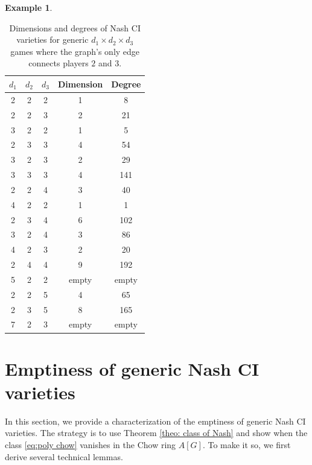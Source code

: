 \documentclass[11pt]{amsart}
\numberwithin{equation}{section}
\theoremstyle{plain}
\numberwithin{theorem}{section}
\theoremstyle{definition}
\newtheorem{example}[theorem]{Example}
\begin{document}
\begin{example}
\begin{table}%
\begin{tabular}{|c|c|c|c|c|}
\hline
$d_1$ & $d_2$ & $d_3$ & Dimension & Degree \\ \hline
2 & 2 & 2 & 1 & 8 \\ \hline
2 & 2 & 3 & 2 & 21 \\ \hline
3 & 2 & 2 & 1 & 5 \\ \hline
2 & 3 & 3 & 4 & 54 \\ \hline
3 & 2 & 3 & 2 & 29 \\ \hline
3 & 3 & 3 & 4 & 141 \\ \hline
2 & 2 & 4 & 3 & 40 \\ \hline
4 & 2 & 2 & 1 & 1 \\ \hline
2 & 3 & 4 & 6 & 102 \\ \hline
3 & 2 & 4 & 3 & 86 \\ \hline
4 & 2 & 3 & 2 & 20 \\ \hline
2 & 4 & 4 & 9 & 192 \\ \hline
5 & 2 & 2 & empty & empty \\ \hline
2 & 2 & 5 & 4 & 65 \\ \hline
2 & 3 & 5 & 8 & 165 \\ \hline
7 & 2 & 3 & empty & empty \\ \hline
\end{tabular}
\caption{Dimensions and degrees of Nash CI varieties for generic $d_1 \times d_2 \times d_3$ games where the graph's only edge connects players $2$ and $3$.}
\label{table:degrees and dims}
\end{table}
\end{example}
\section{Emptiness of generic Nash CI varieties}\label{sec:Emptyness}

In this section, we provide a characterization of the emptiness of generic Nash CI varieties. The strategy is to use Theorem \ref{theo: class of Nash} and show when the class \eqref{eq:poly chow} vanishes in the Chow ring $A[G]$. To make it so, we first derive several technical lemmas.
\end{document}
